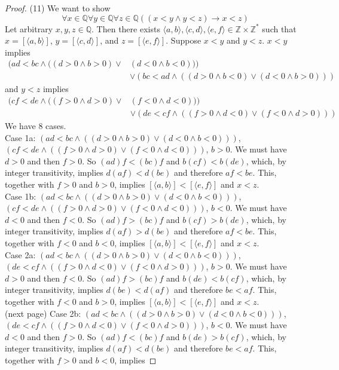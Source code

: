 \documentclass{report}
\begin{document}
\begin{proof}(11)
We want to show
\begin{equation*}
\forall x\in\mathbb Q\forall y\in\mathbb Q\forall z\in\mathbb Q((x<y\land y<z)\to x<z)
\end{equation*}
Let arbitrary $x,y,z\in\mathbb Q$. Then there exists $\langle a,b\rangle,\langle c,d\rangle,\langle e,f\rangle\in\mathbb Z\times\mathbb Z^*$ such that 
$x=[\langle a,b\rangle]$, $y=[\langle c,d\rangle]$, and $z=[\langle e,f\rangle]$. Suppose $x<y$ and $y<z$. $x<y$ implies
\begin{align*}
(ad<bc\land((d>0\land b>0)\lor&(d<0\land b<0)))\\
&\lor(bc<ad\land((d>0\land b<0)\lor(d<0\land b>0)))
\end{align*}
and $y<z$ implies
\begin{align*}
(cf<de\land((f>0\land d>0)\lor&(f<0\land d<0)))\\
&\lor(de<cf\land((f>0\land d<0)\lor(f<0\land d>0)))
\end{align*}
We have 8 cases.\\
\indent Case 1a: $(ad<bc\land((d>0\land b>0)\lor(d<0\land b<0)))$, $(cf<de\land((f>0\land d>0)\lor(f<0\land d<0)))$, $b>0$. We must have $d>0$ and then $f>0$.
So $(ad)f<(bc)f$ and $b(cf)<b(de)$, which, by integer transitivity, implies $d(af)<d(be)$ and therefore $af<be$. This, together with $f>0$ and $b>0$, implies 
$[\langle a,b\rangle]<[\langle e,f\rangle]$ and $x<z$.\\
\indent Case 1b: $(ad<bc\land((d>0\land b>0)\lor(d<0\land b<0)))$, $(cf<de\land((f>0\land d>0)\lor(f<0\land d<0)))$, $b<0$. We must have $d<0$ and then $f<0$.
So $(ad)f>(bc)f$ and $b(cf)>b(de)$, which, by integer transitivity, implies $d(af)>d(be)$ and therefore $af<be$. This, together with $f<0$ and $b<0$, implies 
$[\langle a,b\rangle]<[\langle e,f\rangle]$ and $x<z$.\\
\indent Case 2a: $(ad<bc\land((d>0\land b>0)\lor(d<0\land b<0)))$, $(de<cf\land((f>0\land d<0)\lor(f<0\land d>0)))$, $b>0$. We must have $d>0$ and then $f<0$.
So $(ad)f>(bc)f$ and $b(de)<b(cf)$, which, by integer transitivity, implies $d(be)<d(af)$ and therefore $be<af$. This, together with $f<0$ and $b>0$, implies 
$[\langle a,b\rangle]<[\langle e,f\rangle]$ and $x<z$.\\
(next page)\newpage
\indent Case 2b: $(ad<bc\land((d>0\land b>0)\lor(d<0\land b<0)))$, $(de<cf\land((f>0\land d<0)\lor(f<0\land d>0)))$, $b<0$. We must have $d<0$ and then $f>0$.
So $(ad)f<(bc)f$ and $b(de)>b(cf)$, which, by integer transitivity, implies $d(af)<d(be)$ and therefore $be<af$. This, together with $f>0$ and $b<0$, implies 

\end{proof}
\end{document}
